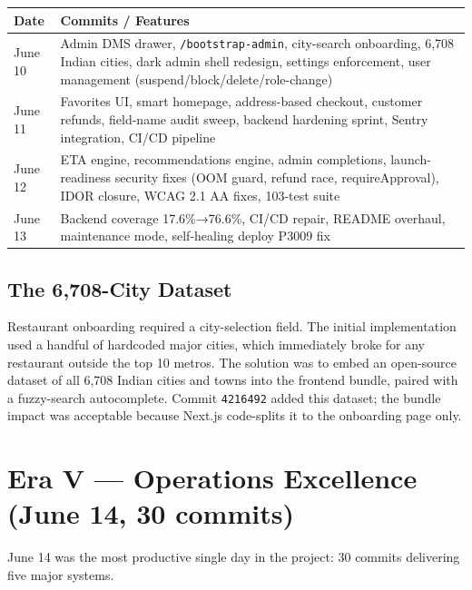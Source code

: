 \documentclass[11pt,a4paper,twoside]{book}
\newcommand{\th}[1]{\textbf{\color{white}#1}}
\begin{document}
\begin{center}\footnotesize
\begin{longtable}{p{3.5cm}p{9cm}}
\toprule
\rowcolor{headbg}\th{Date} & \th{Commits / Features} \\
\midrule
June 10 & Admin DMS drawer, \texttt{/bootstrap-admin}, city-search onboarding, 6,708 Indian cities, dark admin shell redesign, settings enforcement, user management (suspend/block/delete/role-change) \\
\rowcolor{rowalt}June 11 & Favorites UI, smart homepage, address-based checkout, customer refunds, field-name audit sweep, backend hardening sprint, Sentry integration, CI/CD pipeline \\
June 12 & ETA engine, recommendations engine, admin completions, launch-readiness security fixes (OOM guard, refund race, requireApproval), IDOR closure, WCAG 2.1 AA fixes, 103-test suite \\
\rowcolor{rowalt}June 13 & Backend coverage 17.6\%→76.6\%, CI/CD repair, README overhaul, maintenance mode, self-healing deploy P3009 fix \\
\bottomrule
\end{longtable}
\end{center}

\subsection{The 6{,}708-City Dataset}

\begin{tcolorbox}[story]
Restaurant onboarding required a city-selection field.  The initial implementation
used a handful of hardcoded major cities, which immediately broke for any
restaurant outside the top 10 metros.  The solution was to embed an open-source
dataset of all 6,708 Indian cities and towns into the frontend bundle, paired with
a fuzzy-search autocomplete.  Commit \texttt{4216492} added this dataset; the
bundle impact was acceptable because Next.js code-splits it to the onboarding
page only.
\end{tcolorbox}

\section{Era V — Operations Excellence (June 14, 30 commits)}

June 14 was the most productive single day in the project: 30 commits delivering
five major systems.
\end{document}

